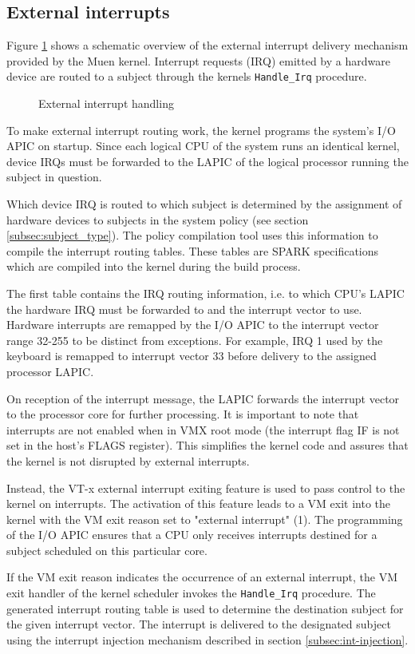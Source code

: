 \subsection{External interrupts}\label{subsec:external-ints}
Figure \ref{fig:external-interrupt} shows a schematic overview of the external
interrupt delivery mechanism provided by the Muen kernel. Interrupt requests
(IRQ) emitted by a hardware device are routed to a subject through
the kernels \texttt{Handle\_Irq} procedure.

\begin{figure}[h]
	\centering
	
	\caption{External interrupt handling}
	\label{fig:external-interrupt}
\end{figure}

To make external interrupt routing work, the kernel programs the system's I/O
APIC on startup. Since each logical CPU of the system runs an identical kernel,
device IRQs must be forwarded to the LAPIC of the logical processor running the
subject in question.

Which device IRQ is routed to which subject is determined by the assignment of
hardware devices to subjects in the system policy (see section
\ref{subsec:subject_type}). The policy compilation tool uses this information to
compile the interrupt routing tables. These tables are SPARK specifications
which are compiled into the kernel during the build process.

The first table contains the IRQ routing information, i.e. to which CPU's LAPIC
the hardware IRQ must be forwarded to and the interrupt vector to use. Hardware
interrupts are remapped by the I/O APIC to the interrupt vector range 32-255 to
be distinct from exceptions. For example, IRQ 1 used by the keyboard is remapped
to interrupt vector 33 before delivery to the assigned processor LAPIC.

On reception of the interrupt message, the LAPIC forwards the interrupt vector
to the processor core for further processing. It is important to note that
interrupts are not enabled when in VMX root mode (the interrupt flag
IF is not set in the host's FLAGS register). This simplifies the
kernel code and assures that the kernel is not disrupted by external interrupts.

Instead, the VT-x external interrupt exiting feature is used to pass control to
the kernel on interrupts. The activation of this feature leads to a VM exit
into the kernel with the VM exit reason set to "external interrupt" (1).  The
programming of the I/O APIC ensures that a CPU only receives interrupts
destined for a subject scheduled on this particular core.

If the VM exit reason indicates the occurrence of an external interrupt, the VM
exit handler of the kernel scheduler invokes the \texttt{Handle\_Irq} procedure.
The generated interrupt routing table is used to determine the destination
subject for the given interrupt vector. The interrupt is delivered to the
designated subject using the interrupt injection mechanism described in section
\ref{subsec:int-injection}.
